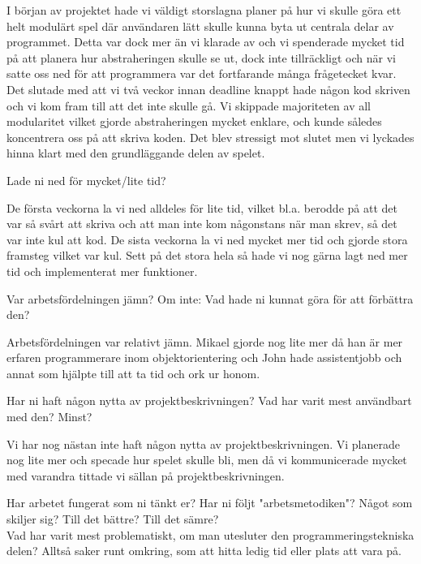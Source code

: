 I början av projektet hade vi väldigt storslagna planer på hur vi skulle göra ett helt modulärt spel där användaren lätt skulle kunna byta ut centrala delar av programmet. Detta var dock mer än vi klarade av och vi spenderade mycket tid på att planera hur abstraheringen skulle se ut, dock inte tillräckligt och när vi satte oss ned för att programmera var det fortfarande många frågetecket kvar. Det slutade med att vi två veckor innan deadline knappt hade någon kod skriven och vi kom fram till att det inte skulle gå. Vi skippade majoriteten av all modularitet vilket gjorde abstraheringen mycket enklare, och kunde således koncentrera oss på att skriva koden. Det blev stressigt mot slutet men vi lyckades hinna klart med den grundläggande delen av spelet. 

{\color{red}Lade ni ned för mycket/lite tid?\\}

De första veckorna la vi ned alldeles för lite tid, vilket bl.a. berodde på att det var så svårt att skriva och att man inte kom någonstans när man skrev, så det var inte kul att kod. De sista veckorna la vi ned mycket mer tid och gjorde stora framsteg vilket var kul. Sett på det stora hela så hade vi nog gärna lagt ned mer tid och implementerat mer funktioner.

{\color{red}Var arbetsfördelningen jämn? Om inte: Vad hade ni kunnat göra för att förbättra den?\\}

Arbetsfördelningen var relativt jämn. Mikael gjorde nog lite mer då han är mer erfaren programmerare inom objektorientering och John hade assistentjobb och annat som hjälpte till att ta tid och ork ur honom.

{\color{red}Har ni haft någon nytta av projektbeskrivningen? Vad har varit mest användbart med den? Minst?\\}

Vi har nog nästan inte haft någon nytta av projektbeskrivningen. Vi planerade nog lite mer och specade hur spelet skulle bli, men då vi kommunicerade mycket med varandra tittade vi sällan på projektbeskrivningen. 

{\color{red}Har arbetet fungerat som ni tänkt er? Har ni följt "arbetsmetodiken"? Något som skiljer sig? Till det bättre? Till det sämre?\\}
{\color{red}Vad har varit mest problematiskt, om man utesluter den programmeringstekniska delen? Alltså saker runt omkring, som att hitta ledig tid eller plats att vara på.\\}


